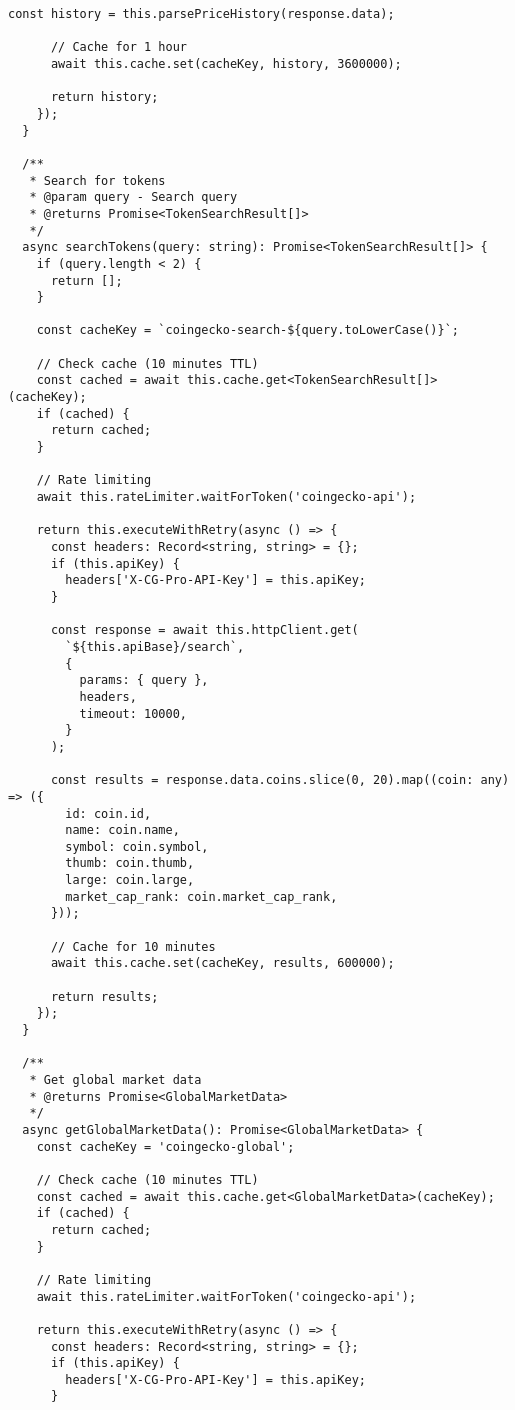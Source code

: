 \documentclass[11pt,a4paper]{article}
\begin{document}
\begin{lstlisting}[style=typescript, caption=CoinGecko Service for Market Data]
      const history = this.parsePriceHistory(response.data);
      
      // Cache for 1 hour
      await this.cache.set(cacheKey, history, 3600000);
      
      return history;
    });
  }

  /**
   * Search for tokens
   * @param query - Search query
   * @returns Promise<TokenSearchResult[]>
   */
  async searchTokens(query: string): Promise<TokenSearchResult[]> {
    if (query.length < 2) {
      return [];
    }

    const cacheKey = `coingecko-search-${query.toLowerCase()}`;
    
    // Check cache (10 minutes TTL)
    const cached = await this.cache.get<TokenSearchResult[]>(cacheKey);
    if (cached) {
      return cached;
    }

    // Rate limiting
    await this.rateLimiter.waitForToken('coingecko-api');

    return this.executeWithRetry(async () => {
      const headers: Record<string, string> = {};
      if (this.apiKey) {
        headers['X-CG-Pro-API-Key'] = this.apiKey;
      }

      const response = await this.httpClient.get(
        `${this.apiBase}/search`,
        {
          params: { query },
          headers,
          timeout: 10000,
        }
      );

      const results = response.data.coins.slice(0, 20).map((coin: any) => ({
        id: coin.id,
        name: coin.name,
        symbol: coin.symbol,
        thumb: coin.thumb,
        large: coin.large,
        market_cap_rank: coin.market_cap_rank,
      }));
      
      // Cache for 10 minutes
      await this.cache.set(cacheKey, results, 600000);
      
      return results;
    });
  }

  /**
   * Get global market data
   * @returns Promise<GlobalMarketData>
   */
  async getGlobalMarketData(): Promise<GlobalMarketData> {
    const cacheKey = 'coingecko-global';
    
    // Check cache (10 minutes TTL)
    const cached = await this.cache.get<GlobalMarketData>(cacheKey);
    if (cached) {
      return cached;
    }

    // Rate limiting
    await this.rateLimiter.waitForToken('coingecko-api');

    return this.executeWithRetry(async () => {
      const headers: Record<string, string> = {};
      if (this.apiKey) {
        headers['X-CG-Pro-API-Key'] = this.apiKey;
      }


\end{lstlisting}
\end{document}
